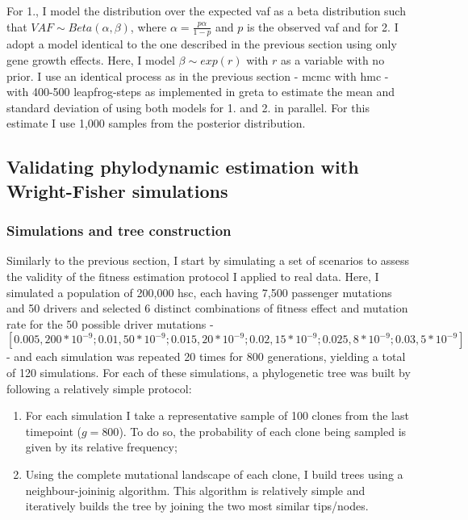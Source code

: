 For 1., I model the distribution over the expected \ac{vaf} as a beta distribution such that $VAF \sim Beta(\alpha,\beta)$, where $\alpha=\frac{p\alpha}{1-p}$ and $p$ is the observed \ac{vaf} and for 2. I adopt a model identical to the one described in the previous section using only gene growth effects. Here, I model $\beta \sim exp(r)$ with $r$ as a variable with no prior. I use an identical process as in the previous section - \ac{mcmc} with \ac{hmc} - with 400-500 leapfrog-steps as implemented in greta \cite{Golding2019-wh} to estimate the mean and standard deviation of  using both models for 1. and 2. in parallel. For this estimate I use 1,000 samples from the posterior distribution.

\subsection{Validating phylodynamic estimation with Wright-Fisher simulations}

\subsubsection{Simulations and tree construction}

Similarly to the previous section, I start by simulating a set of scenarios to assess the validity of the fitness estimation protocol I applied to real data. Here, I simulated a population of 200,000 \ac{hsc}, each having 7,500 passenger mutations and 50 drivers and selected 6 distinct combinations of fitness effect and mutation rate for the 50 possible driver mutations - $[0.005,200*10^{-9}; 0.01,50*10^{-9}; 0.015,20*10^{-9}; 0.02,15*10^{-9}; 0.025,8*10^{-9}; 0.03,5*10^{-9}]$ - and each simulation was repeated 20 times for 800 generations, yielding a total of 120 simulations. For each of these simulations, a phylogenetic tree was built by following a relatively simple protocol:

\begin{enumerate}
    \item For each simulation I take a representative sample of 100 clones from the last timepoint ($g = 800$). To do so, the probability of each clone being sampled is given by its relative frequency;
    \item Using the complete mutational landscape of each clone, I build trees using a neighbour-joininig algorithm. This algorithm is relatively simple and iteratively builds the tree by joining the two most similar tips/nodes. 
\end{enumerate}

